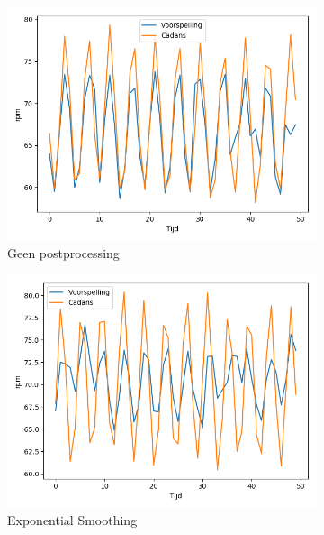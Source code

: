 \begin{figure}[t!]
\centering
\begin{subfigure}{.5\textwidth}
  \centering
  \includegraphics[width=\linewidth]{images/actual-prediction+noice,nopp.png}
  \caption{Geen postprocessing}
  \label{fig:geen postprocessing}
\end{subfigure}%
\begin{subfigure}{.5\textwidth}
  \centering
  \includegraphics[width=\linewidth]{images/actual-prediction+noice,es.png}
  \caption{Exponential Smoothing}
  \label{fig:exponential smoothing postprocessing}
\end{subfigure}
\begin{subfigure}{.5\textwidth}
  \centering

\end{subfigure}
\end{figure}
